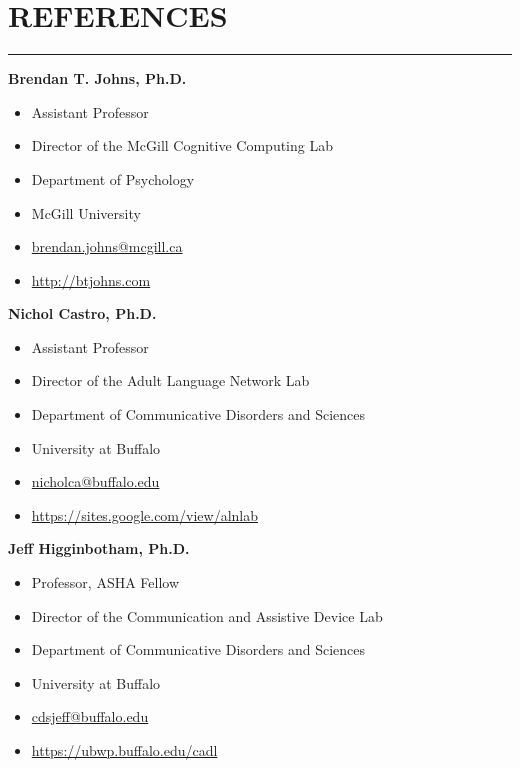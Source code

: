 \documentclass[11pt]{article}
\newcommand{\cvsection}[1]{\vspace{-0.2cm}\section*{\Large #1}\vspace{-0.2cm}\hrule\vspace{0.2cm}}
\begin{document}
\cvsection{REFERENCES}

\textbf{Brendan T. Johns, Ph.D.}

\begin{itemize}[leftmargin=!,labelindent=!]
    \item[] Assistant Professor
    \item[] Director of the McGill Cognitive Computing Lab
    \item[] Department of Psychology
    \item[] McGill University
    \item[] \href{mailto:brendan.johns@mcgill.ca}{brendan.johns@mcgill.ca}
    \item[] \url{http://btjohns.com}
\end{itemize}

\vspace{0.2cm}

\textbf{Nichol Castro, Ph.D.}

\begin{itemize}[leftmargin=!,labelindent=!]
    \item[] Assistant Professor
    \item[] Director of the Adult Language Network Lab
    \item[] Department of Communicative Disorders and Sciences
    \item[] University at Buffalo
    \item[] \href{mailto:nicholca@buffalo.edu}{nicholca@buffalo.edu}
    \item[] \url{https://sites.google.com/view/alnlab}
\end{itemize}

\vspace{0.2cm}

\textbf{Jeff Higginbotham, Ph.D.}

\begin{itemize}[leftmargin=!,labelindent=!]
    \item[] Professor, ASHA Fellow
    \item[] Director of the Communication and Assistive Device Lab
    \item[] Department of Communicative Disorders and Sciences
    \item[] University at Buffalo
    \item[] \href{mailto:cdsjeff@buffalo.edu}{cdsjeff@buffalo.edu}
    \item[] \url{https://ubwp.buffalo.edu/cadl}
\end{itemize}
\end{document}
